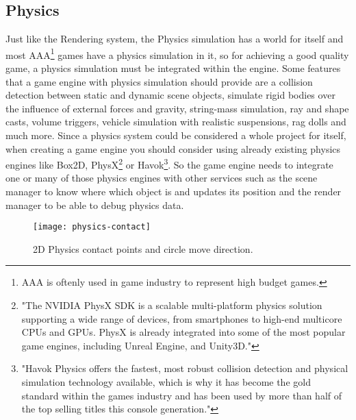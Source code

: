 \subsection{Physics}
Just like the Rendering system, the Physics simulation has a world for itself and most AAA\footnote{AAA is oftenly used in game industry to represent high budget games.} games have a physics simulation in it, so for achieving a good quality game, a physics simulation must be integrated within the engine\cite{GamePhysicsEngineDevelopment}. Some features that a game engine with physics simulation should provide are a collision detection between static and dynamic scene objects, simulate rigid bodies over the influence of external forces and gravity, string-mass simulation, ray and shape casts, volume triggers, vehicle simulation with realistic suspensions, rag dolls and much more\cite{GameEngineArchitecture}. Since a physics system could be considered a whole project for itself, when creating a game engine you should consider using already existing physics engines like Box2D, PhysX\footnote{"The NVIDIA PhysX SDK is a scalable multi-platform physics solution supporting a wide range of devices, from smartphones to high-end multicore CPUs and GPUs. PhysX is already integrated into some of the most popular game engines, including Unreal Engine, and Unity3D."\cite{PhysXAbout}} or Havok\footnote{"Havok Physics offers the fastest, most robust collision detection and physical simulation technology available, which is why it has become the gold standard within the games industry and has been used by more than half of the top selling titles this console generation."\cite{HavokAbout}}\cite{PhysicsForGameDevelopers}. So the game engine needs to integrate one or many of those physics engines with other services such as the scene manager to know where which object is and updates its position and the render manager to be able to debug physics data.

\begin{figure}[!h] \centering \texttt{[image: physics-contact]} \caption{2D Physics contact points and circle move direction\cite{GameEngineArchitecture}.} \label{fig:physics-contact} \end{figure}